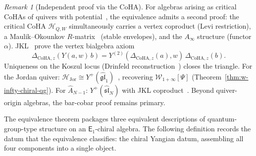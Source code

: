 \documentclass[11pt,reqno]{amsart}
\theoremstyle{definition}
\theoremstyle{remark}
\newtheorem{remark}[theorem]{Remark}
\newcommand{\cH}{\mathcal{H}}
\newcommand{\cW}{\mathcal{W}}
\newcommand{\Ainf}{A_{\infty}}
\newcommand{\Eone}{\mathsf{E}_{1}}
\numberwithin{equation}{section}
\begin{document}
\begin{remark}[Independent proof via the CoHA]
\label{rem:independent-proof-coha}
For algebras arising as critical CoHAs of quivers with
potential~\cite{KS11,SV13,YZ18a,JKL26}, the equivalence
admits a second proof: the critical CoHA
$\cH_{Q,W}$ simultaneously carries a vertex coproduct
(Levi restriction), a Maulik--Okounkov $R$-matrix~\cite{MO19}
(stable envelopes), and the $\Ainf$ structure (functor
$\alpha$). JKL~\cite{JKL26} prove the vertex bialgebra axiom
\begin{equation}\label{eq:jkl-vertex-bialgebra}
  \Delta_{\mathrm{CoHA},z}(Y(a,w)\,b)
  = Y^{(2)}(\Delta_{\mathrm{CoHA},z}(a),w)\,
  \Delta_{\mathrm{CoHA},z}(b).
\end{equation}
Uniqueness on the Koszul locus (Drinfeld
reconstruction~\cite{Drinfeld90,EK96}) closes the triangle.
For the Jordan quiver: $\cH_{\mathrm{Jor}} \cong
Y^+(\widehat{\mathfrak{gl}}_1)$~\cite{SV13}, recovering
$\cW_{1+\infty}[\Psi]$
(Theorem~\ref{thm:w-infty-chiral-qg}).
For $\widehat{A}_{N-1}$: $Y^+(\widehat{\mathfrak{sl}}_N)$
with JKL coproduct~\cite{JKL26}. Beyond quiver-origin
algebras, the bar-cobar proof remains primary.
\end{remark}

The equivalence theorem packages three equivalent descriptions
of quantum-group-type structure on an $\Eone$-chiral algebra.
The following definition records the datum that the equivalence
classifies: the chiral Yangian datum, assembling all four
components into a single object.
\end{document}
